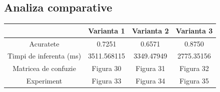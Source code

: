 \documentclass{article}
\begin{document}
\subsection{Analiza comparative}
\bigskip
{\centering
\begin{tabular}{c || c c c} \toprule
    {} & {Varianta 1} & {Varianta 2} & {Varianta 3} \\ \midrule
    {Acuratete} & 0.7251 & 0.6571 & 0.8750 \\
    {Timpi de inferenta (ms)} & 3511.568115 & 3349.47949 & 2775.35156 \\
    {Matricea de confuzie} & {Figura 30} & {Figura 31} & {Figura 32} \\
    {Experiment} & {Figura 33} & {Figura 34} & {Figura 35} \\
\end{tabular}\par}
\bigskip
\end{document}
